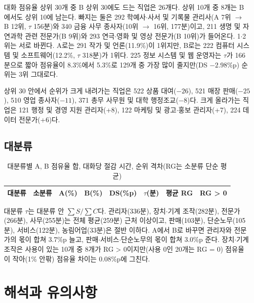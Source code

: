 \documentclass[11pt]{article}
\begin{document}
대화 점유율 상위 30개 중 B 상위 30에도 드는 직업은 26개다. 상위 10개 중 8개는 B에서도 상위 10에 남는다. 빠지는 둘은 292 학예사$\cdot$사서 및 기록물 관리사(A 7위 $\to$ B 12위, $\tau$ 156분)와 340 금융 사무 종사자(10위 $\to$ 16위, 177분)이고, 211 생명 및 자연과학 관련 전문가(B 9위)와 293 연극$\cdot$영화 및 영상 전문가(B 10위)가 들어온다. 1$\cdot$2위는 서로 바뀐다. A로는 291 작가 및 언론(11.9\%)이 1위지만, B로는 222 컴퓨터 시스템 및 소프트웨어(12.2\%, $\tau$ 318분)가 1위다. 225 정보 시스템 및 웹 운영자는 $\tau$가 166분으로 짧아 점유율이 8.3\%에서 5.3\%로 129개 중 가장 많이 줄지만(DS $-2.98$\%p) 순위는 3위 그대로다.

상위 30 안에서 순위가 크게 내려가는 직업은 522 상품 대여($-26$), 521 매장 판매($-25$), 510 영업 종사자($-11$), 371 총무 사무원 및 대학 행정조교($-8$)다. 크게 올라가는 직업은 121 행정 및 경영 지원 관리자(+8), 122 마케팅 및 광고$\cdot$홍보 관리자(+7), 224 데이터 전문가(+6)다.

\subsection{대분류}

\begin{longtable}{L{4.6cm}R{0.9cm}R{1.3cm}R{1.3cm}R{1.6cm}R{1.4cm}R{1.6cm}R{1.6cm}}
\caption{대분류별 A, B 점유율 합, 대화당 절감 시간, 순위 격차(RG는 소분류 단순 평균)}\label{tab:ksco1}\\
\toprule
대분류 & 소분류 & A(\%) & B(\%) & DS(\%p) & $\tau$(분) & 평균 RG & RG > 0 \\
\midrule
\endfirsthead

\bottomrule
\end{longtable}

대분류 $\tau$는 대분류 안 $\sum S / \sum C$다. 관리자(336분), 장치$\cdot$기계 조작(282분), 전문가(266분), 사무(255분)는 전체 평균(259분) 근처 이상이고, 판매(103분), 단순노무(105분), 서비스(122분), 농림어업(33분)은 절반 이하다. A에서 B로 바꾸면 관리자와 전문가의 몫이 합쳐 3.7\%p 늘고, 판매$\cdot$서비스$\cdot$단순노무의 몫이 합쳐 3.0\%p 준다. 장치$\cdot$기계 조작은 사용이 있는 10개 중 8개가 RG > 0이지만(사용 0인 20개는 RG = 0) 점유율이 작아(1\% 안팎) 점유율 차이는 0.08\%p에 그친다.

\section{해석과 유의사항}
\end{document}
